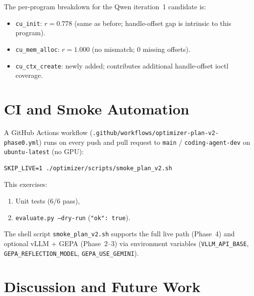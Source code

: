\documentclass[11pt,a4paper]{article}
\begin{document}
The per-program breakdown for the Qwen iteration~1 candidate is:
\begin{itemize}[leftmargin=*]
  \item \texttt{cu\_init}: $r = 0.778$ (same as before; handle-offset gap is
        intrinsic to this program).
  \item \texttt{cu\_mem\_alloc}: $r = 1.000$ (no mismatch; 0 missing offsets).
  \item \texttt{cu\_ctx\_create}: newly added; contributes additional handle-offset
        ioctl coverage.
\end{itemize}

\section{CI and Smoke Automation}
\label{sec:ci}

A GitHub Actions workflow
(\texttt{.github/workflows/optimizer-plan-v2-phase0.yml}) runs on every push
and pull request to \texttt{main} / \texttt{coding-agent-dev} on
\texttt{ubuntu-latest} (no GPU):

\begin{lstlisting}[style=shell]
SKIP_LIVE=1 ./optimizer/scripts/smoke_plan_v2.sh
\end{lstlisting}

This exercises:
\begin{enumerate}[leftmargin=*]
  \item Unit tests (6/6 pass),
  \item \texttt{evaluate.py --dry-run} (\texttt{"ok": true}).
\end{enumerate}

The shell script \texttt{smoke\_plan\_v2.sh} supports the full live path
(Phase~4) and optional vLLM + GEPA (Phase~2--3) via environment variables
(\texttt{VLLM\_API\_BASE}, \texttt{GEPA\_REFLECTION\_MODEL}, \texttt{GEPA\_USE\_GEMINI}).

\section{Discussion and Future Work}
\label{sec:future}
\end{document}
